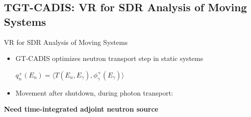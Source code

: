 \documentclass{beamer}
\begin{document}
%
\subsection{TGT-CADIS: VR for SDR Analysis of Moving Systems}
\begin{frame}{VR for SDR Analysis of Moving Systems}
	\begin{itemize}
		\item{GT-CADIS optimizes neutron transport step in static
			systems}
			\begin{center}
	$q^{+}_n(E_n) = \langle T(E_n, E_{\gamma}) ,
	\phi_{\gamma}^{+}(E_{\gamma}) \rangle$
			\end{center}
			\vspace{0.5cm}
		\item{Movement after shutdown, during photon transport:}
	\end{itemize}
	\vspace{0.5cm}
	\centering
		{\textbf{Need time-integrated adjoint neutron source}}

\end{frame}
\end{document}
